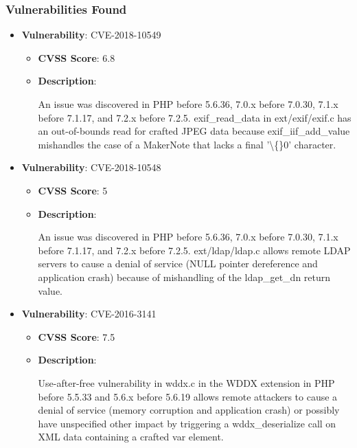 \documentclass{article}
\begin{document}
\subsubsection*{Vulnerabilities Found}

\begin{itemize}
    
        \item \textbf{Vulnerability}: CVE-2018-10549
        \begin{itemize}
            \item \textbf{CVSS Score}:  6.8 
            \item \textbf{Description}:
            \parbox[t]{0.9\linewidth}{
                \ttfamily An issue was discovered in PHP before 5.6.36, 7.0.x before 7.0.30, 7.1.x before 7.1.17, and 7.2.x before 7.2.5. exif\_read\_data in ext/exif/exif.c has an out-of-bounds read for crafted JPEG data because exif\_iif\_add\_value mishandles the case of a MakerNote that lacks a final '\textbackslash\{\}0' character.
            }
        \end{itemize}
    
        \item \textbf{Vulnerability}: CVE-2018-10548
        \begin{itemize}
            \item \textbf{CVSS Score}:  5 
            \item \textbf{Description}:
            \parbox[t]{0.9\linewidth}{
                \ttfamily An issue was discovered in PHP before 5.6.36, 7.0.x before 7.0.30, 7.1.x before 7.1.17, and 7.2.x before 7.2.5. ext/ldap/ldap.c allows remote LDAP servers to cause a denial of service (NULL pointer dereference and application crash) because of mishandling of the ldap\_get\_dn return value.
            }
        \end{itemize}
    
        \item \textbf{Vulnerability}: CVE-2016-3141
        \begin{itemize}
            \item \textbf{CVSS Score}:  7.5 
            \item \textbf{Description}:
            \parbox[t]{0.9\linewidth}{
                \ttfamily Use-after-free vulnerability in wddx.c in the WDDX extension in PHP before 5.5.33 and 5.6.x before 5.6.19 allows remote attackers to cause a denial of service (memory corruption and application crash) or possibly have unspecified other impact by triggering a wddx\_deserialize call on XML data containing a crafted var element.
            }
        \end{itemize}
    

\end{itemize}
\end{document}
